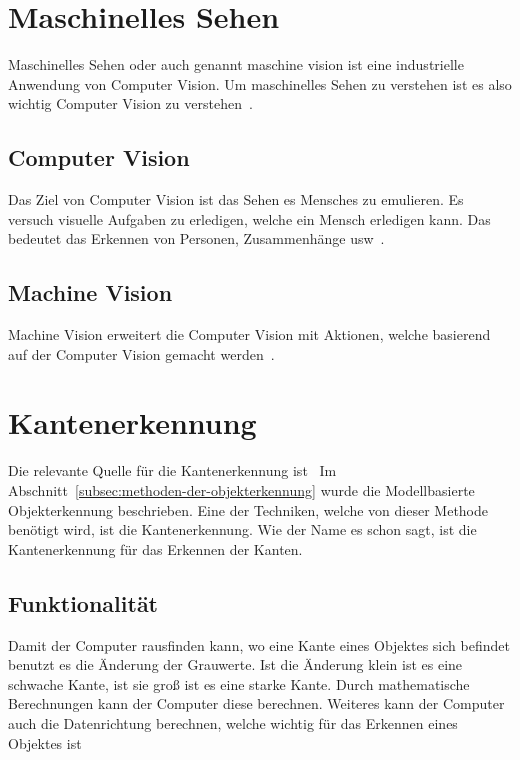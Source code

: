 \section{Maschinelles Sehen}
\label{sec:maschinelles-sehen}

Maschinelles Sehen oder auch genannt maschine vision ist eine industrielle Anwendung von Computer Vision.
Um maschinelles Sehen zu verstehen ist es also wichtig Computer Vision zu verstehen~\cite{Anonym_2014}.

\subsection{Computer Vision}
\label{subsec:computer-vision}

Das Ziel von Computer Vision ist das Sehen es Mensches zu emulieren.
Es versuch visuelle Aufgaben zu erledigen, welche ein Mensch erledigen kann.
Das bedeutet das Erkennen von Personen, Zusammenhänge usw~\cite{Huang1996ComputerVE}.

\subsection{Machine Vision}\label{subsec:machine-vision}

Machine Vision erweitert die Computer Vision mit Aktionen, welche basierend auf der Computer Vision gemacht werden~\cite{Anonym_2014}.

\section{Kantenerkennung}\label{sec:kantenerkennung}

Die relevante Quelle für die Kantenerkennung ist~\cite{Lordemann}
Im Abschnitt~\ref{subsec:methoden-der-objekterkennung} wurde die Modellbasierte Objekterkennung beschrieben.
Eine der Techniken, welche von dieser Methode benötigt wird, ist die Kantenerkennung.
Wie der Name es schon sagt, ist die Kantenerkennung für das Erkennen der Kanten.

\subsection{Funktionalität}
\label{subsec:funktionalitaet}

Damit der Computer rausfinden kann, wo eine Kante eines Objektes sich befindet benutzt es die Änderung der Grauwerte.
Ist die Änderung klein ist es eine schwache Kante, ist sie groß ist es eine starke Kante.
Durch mathematische Berechnungen kann der Computer diese berechnen.
Weiteres kann der Computer auch die Datenrichtung berechnen, welche wichtig für das Erkennen eines Objektes ist

